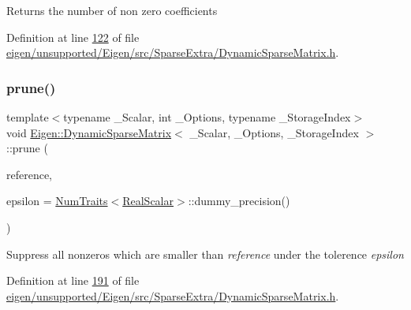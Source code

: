 \begin{DoxyReturn}{Returns}
the number of non zero coefficients 
\end{DoxyReturn}


Definition at line \hyperlink{eigen_2unsupported_2_eigen_2src_2_sparse_extra_2_dynamic_sparse_matrix_8h_source_l00122}{122} of file \hyperlink{eigen_2unsupported_2_eigen_2src_2_sparse_extra_2_dynamic_sparse_matrix_8h_source}{eigen/unsupported/\+Eigen/src/\+Sparse\+Extra/\+Dynamic\+Sparse\+Matrix.\+h}.

\mbox{\label{class_eigen_1_1_dynamic_sparse_matrix_af3b38485a69d03e5c53d9ba57f9ce1d0}} 
\subsubsection{\texorpdfstring{prune()}{prune()}\hspace{0.1cm}{\footnotesize\ttfamily [1/2]}}
{\footnotesize\ttfamily template$<$typename \+\_\+\+Scalar, int \+\_\+\+Options, typename \+\_\+\+Storage\+Index$>$ \\
void \hyperlink{class_eigen_1_1_dynamic_sparse_matrix}{Eigen\+::\+Dynamic\+Sparse\+Matrix}$<$ \+\_\+\+Scalar, \+\_\+\+Options, \+\_\+\+Storage\+Index $>$\+::prune (\begin{DoxyParamCaption}\item[{Scalar}]{reference,  }\item[{\hyperlink{group___sparse_core___module_aaec8ace6efb785c81d442931c3248d88}{Real\+Scalar}}]{epsilon = {\ttfamily \hyperlink{group___core___module_struct_eigen_1_1_num_traits}{Num\+Traits}$<$\hyperlink{group___sparse_core___module_aaec8ace6efb785c81d442931c3248d88}{Real\+Scalar}$>$\+:\+:dummy\+\_\+precision()} }\end{DoxyParamCaption})\hspace{0.3cm}{\ttfamily [inline]}}

Suppress all nonzeros which are smaller than {\itshape reference} under the tolerence {\itshape epsilon} 

Definition at line \hyperlink{eigen_2unsupported_2_eigen_2src_2_sparse_extra_2_dynamic_sparse_matrix_8h_source_l00191}{191} of file \hyperlink{eigen_2unsupported_2_eigen_2src_2_sparse_extra_2_dynamic_sparse_matrix_8h_source}{eigen/unsupported/\+Eigen/src/\+Sparse\+Extra/\+Dynamic\+Sparse\+Matrix.\+h}.

